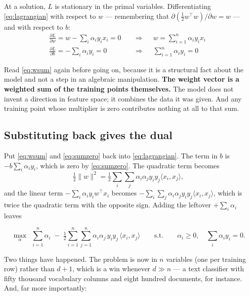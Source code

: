 \documentclass[11pt]{article}
\begin{document}
At a solution, $L$ is stationary in the primal variables. Differentiating
\eqref{eq:lagrangian} with respect to $w$ --- remembering that
$\partial(\tfrac12 w^\top w)/\partial w = w$ --- and with respect to $b$:
\begin{align}
  \frac{\partial L}{\partial w} = w - \sum_i \alpha_i y_i x_i = 0
  &\quad\Longrightarrow\quad
  \boxed{\; w = \sum_{i=1}^n \alpha_i y_i x_i \;}
  \label{eq:wsum}\\[0.3em]
  \frac{\partial L}{\partial b} = -\sum_i \alpha_i y_i = 0
  &\quad\Longrightarrow\quad
  \boxed{\; \sum_{i=1}^n \alpha_i y_i = 0 \;}
  \label{eq:sumzero}
\end{align}

Read \eqref{eq:wsum} again before going on, because it is a structural fact
about the model and not a step in an algebraic manipulation. \textbf{The weight
vector is a weighted sum of the training points themselves.} The model does not
invent a direction in feature space; it combines the data it was given. And any
training point whose multiplier is zero contributes nothing at all to that sum.

\subsection{Substituting back gives the dual}

Put \eqref{eq:wsum} and \eqref{eq:sumzero} back into \eqref{eq:lagrangian}.
The term in $b$ is $-b\sum_i \alpha_i y_i$, which is zero by
\eqref{eq:sumzero}. The quadratic term becomes
\[
  \tfrac12 \|w\|^2
  = \tfrac12 \sum_i\sum_j \alpha_i\alpha_j y_i y_j \langle x_i, x_j\rangle ,
\]
and the linear term $-\sum_i \alpha_i y_i w^\top x_i$ becomes
$-\sum_i\sum_j \alpha_i\alpha_j y_i y_j \langle x_i, x_j\rangle$, which is
twice the quadratic term with the opposite sign. Adding the leftover
$+\sum_i \alpha_i$ leaves

\begin{keyidea}
\[
  \max_{\alpha}\ \ \sum_{i=1}^{n}\alpha_i
    \;-\; \tfrac12 \sum_{i=1}^{n}\sum_{j=1}^{n}
      \alpha_i\alpha_j\,y_i y_j\, \langle x_i, x_j\rangle
  \qquad\text{s.t.}\qquad
  \alpha_i \ge 0,\quad \sum_i \alpha_i y_i = 0 .
\]
\end{keyidea}

Two things have happened. The problem is now in $n$ variables (one per training
row) rather than $d + 1$, which is a win whenever $d \gg n$ --- a text
classifier with fifty thousand vocabulary columns and eight hundred documents,
for instance. And, far more importantly:
\end{document}
